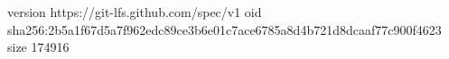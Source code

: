 version https://git-lfs.github.com/spec/v1
oid sha256:2b5a1f67d5a7f962edc89ce3b6e01c7ace6785a8d4b721d8dcaaf77c900f4623
size 174916
